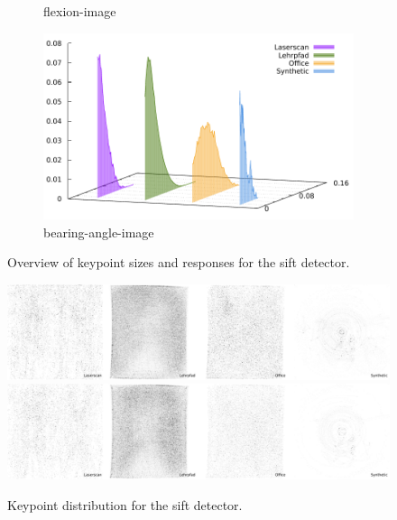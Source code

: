 \begin{figure}[H]
\begin{subfigure}[t]{0.45\linewidth}
    \caption{\gls{flexion-image}}
\end{subfigure}\quad
\begin{subfigure}[t]{0.45\linewidth}
    \includegraphics[width=\linewidth]{chapter06/results/SIFT/bearing/response.pdf}
    \caption{\gls{bearing-angle-image}}
\end{subfigure}
    \caption{Overview of keypoint sizes and responses for the \acrshort{sift} detector.}
\end{figure}
\begin{figure}[H]
    \includegraphics[width=\linewidth]{chapter06/results/SIFT/flexion/distribution.pdf}\\
    \includegraphics[width=\linewidth]{chapter06/results/SIFT/bearing/distribution.pdf}%
    \caption{Keypoint distribution for the \acrshort{sift} detector.}\label{fig:sift_kp_distribution}
\end{figure}
